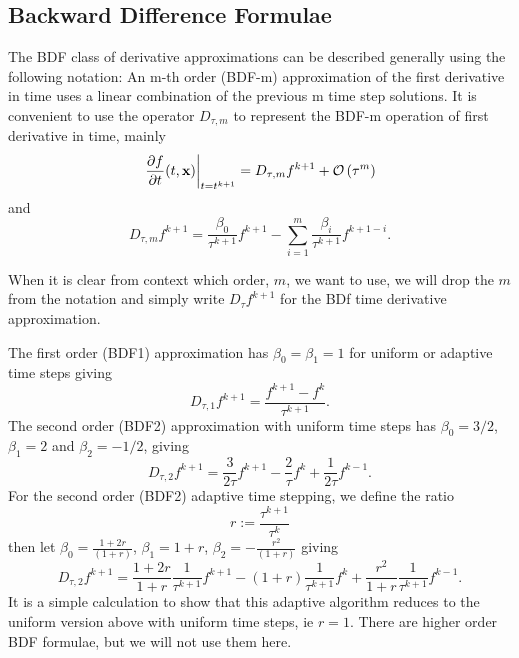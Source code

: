 \documentclass[letterpaper]{erdc}
\begin{document}
%
%
\subsection{Backward Difference Formulae}
The BDF class of derivative approximations can be described generally using the following notation: An m-th order (BDF-m) approximation of the first derivative in time  uses a linear combination of the previous m time step solutions. It is convenient to use the operator $D_{\tau,m}$ to represent the BDF-m operation of first derivative in time, mainly
\begin{equation}
 \left.\frac{\partial f}{\partial t}(t,\textbf{x})\right|_{t=t^{k+1}} =  D_{\tau,m}f^{k+1} + \mathcal{O}\left(\tau^m\right)
\end{equation}
and
\begin{equation}
  D_{\tau,m}f^{k+1} =  \frac{\beta_0}{\tau^{k+1}}f^{k+1} - \displaystyle\sum_{i=1}^{m} \frac{\beta_{i}}{\tau^{k+1}} f^{k+1-i}.
\end{equation}

\begin{remark}
When it is clear from context which order, $m$, we want to use, we will drop the $m$ from the notation and simply write $D_{\tau}f^{k+1}$ for the BDf time derivative approximation.
\end{remark}

The first order (BDF1) approximation has $\beta_0 = \beta_1 = 1$ for uniform or adaptive time steps giving
\begin{equation}
  D_{\tau,1} f^{k+1} = \frac{f^{k+1} - f^{k}}{\tau^{k+1}}.
\end{equation}
The second order (BDF2) approximation with uniform time steps has $\beta_0 = 3/2$, $\beta_1 = 2$ and $\beta_2 = -1/2$, giving
\begin{equation}  
  D_{\tau,2} f^{k+1} = \frac{3}{2\tau}f^{k+1} - \frac{2}{\tau}f^{k} + \frac{1}{2\tau}f^{k-1}.
\end{equation}
For the second order (BDF2) adaptive time stepping, we define the ratio
\begin{equation}
  r:=\frac{\tau^{k+1}}{\tau^{k}}
\end{equation}
then let $\beta_0 = \frac{1+2r}{(1+r)}$, $\beta_1 = 1+r$, $\beta_2 = -\frac{r^2}{(1+r)}$ giving
\begin{equation} \label{eq:bdf2withvariabletimestep} 
  D_{\tau,2} f^{k+1} = \frac{1+2r}{1+r}\frac{1}{\tau^{k+1}}f^{k+1} - (1+r)\frac{1}{\tau^{k+1}}f^{k} + \frac{r^2}{1+r}\frac{1}{\tau^{k+1}}f^{k-1}.
\end{equation}
It is a simple calculation to show that this adaptive algorithm reduces to the uniform version above with uniform time steps, ie $r=1$.  There are higher order BDF formulae, but we will not use them here.
\end{document}
